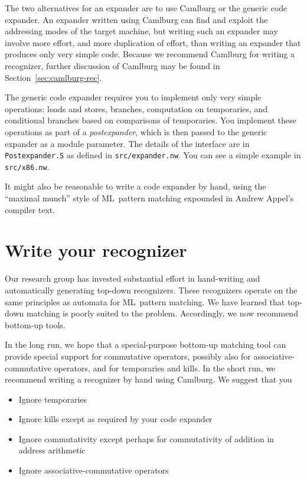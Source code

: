\documentclass[12pt]{article}
\begin{document}
The two alternatives for an expander are to use Camlburg or the
generic code expander.
An expander written using Camlburg can find and exploit the
addressing modes of the target machine, but writing such an expander
may involve more effort, and more duplication of effort, than writing
an expander that produces only very simple code.
Because we recommend Camlburg for writing a recognizer, further
discussion of Camlburg may be found in Section~\ref{sec:camlburg-rec}.

The generic code expander requires you to implement only very simple
operations: loads and stores, branches, computation on temporaries, and
conditional branches based on comparisons of temporaries.
You implement these operations as part of a \emph{postexpander}, which
is then passed to the generic expander as a module parameter.
The details of the interface are in \texttt{Postexpander.S} as
defined in \texttt{src/expander.nw}.
You can see a simple example in \texttt{src/x86.nw}.

It might also be reasonable to write a code expander by hand, using
the ``maximal munch'' style of ML~pattern matching expounded in Andrew
Appel's compiler text.

\section{Write your recognizer}

Our research group has invested substantial effort in hand-writing and
automatically generating top-down recognizers.
These recognizers operate on the same principles as automata for
ML~pattern matching.
We have learned that top-down matching is poorly suited to the
problem.
Accordingly, we now recommend bottom-up tools.

\label{sec:camlburg-rec}

In the long run, we hope that a special-purpose bottom-up matching
tool can provide special support for commutative operators, possibly
also for
associative-commutative operators, and for
temporaries and kills.
In the short run, we recommend writing a recognizer by hand using
Camlburg.
We suggest that you
\begin{itemize}
\item
Ignore temporaries
\item
Ignore kills except as required by your code expander
\item
Ignore commutativity except perhaps for commutativity of addition in
address arithmetic
\item
Ignore associative-commutative operators
\end{itemize}
\end{document}

